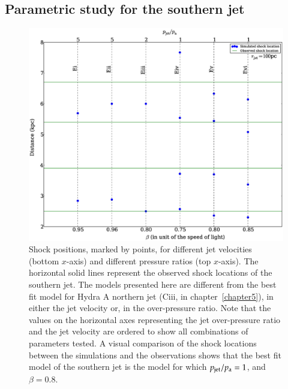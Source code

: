 \subsection{Parametric study for the southern jet}\label{s:param_study}
\begin{figure}[ht!]
\includegraphics[width=\textwidth]{sps.eps}
\caption{Shock positions, marked by points, for different jet velocities (bottom $x$-axis) and different pressure ratios (top $x$-axis). The horizontal solid lines represent the observed shock locations of the southern jet. The models presented here are different from the best fit model for Hydra A northern jet (Ciii, in chapter~\ref{chapter5}), in either the jet velocity or, in the over-pressure ratio. Note that the values on the horizontal axes representing the jet over-pressure ratio and the jet velocity are ordered to show all combinations of parameters tested. A visual comparison of the shock locations between the simulations and the observations shows that the best fit model of the southern jet is the model for which $p_{\rm jet}/p_{\rm a}=1$, and $\beta = 0.8$.  }
\label{p_s_s}
\end{figure}


